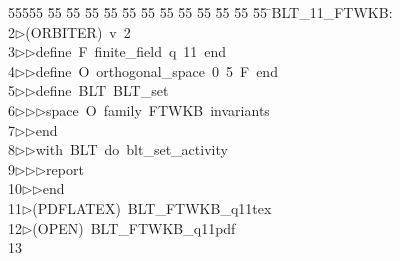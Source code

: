 %
%
\begin{tabbing}
55555 \= 55 \= 55 \= 55 \= 55 \= 55 \= 55 \= 55 \= 55 \= 55 \= 55 \= 55 \= 55 \= \>BLT\_11\_FTWKB:\\[0pt]
2\>$\triangleright$\>(ORBITER)\ v\ 2\ \\[0pt]
3\>$\triangleright$\>$\triangleright$\>define\ F\ finite\_field\ q\ 11\ end\ \\[0pt]
4\>$\triangleright$\>$\triangleright$\>define\ O\ orthogonal\_space\ 0\ 5\ F\ end\ \\[0pt]
5\>$\triangleright$\>$\triangleright$\>define\ BLT\ BLT\_set\ \\[0pt]
6\>$\triangleright$\>$\triangleright$\>$\triangleright$\>space\ O\ family\ FTWKB\ invariants\ \\[0pt]
7\>$\triangleright$\>$\triangleright$\>end\ \\[0pt]
8\>$\triangleright$\>$\triangleright$\>with\ BLT\ do\ blt\_set\_activity\ \\[0pt]
9\>$\triangleright$\>$\triangleright$\>$\triangleright$\>report\ \\[0pt]
10\>$\triangleright$\>$\triangleright$\>end\\[0pt]
11\>$\triangleright$\>(PDFLATEX)\ BLT\_FTWKB\_q11tex\\[0pt]
12\>$\triangleright$\>(OPEN)\ BLT\_FTWKB\_q11pdf\\[0pt]
13\>\end{tabbing}
